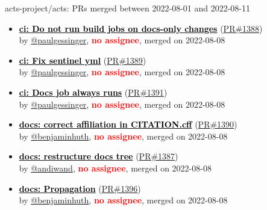 \begin{frame}[allowframebreaks]{ acts-project/acts: PRs merged 
between 2022-08-01 and 2022-08-11
}
\begin{itemize}
    \item\prmerged
    \hspace*{0.1em}
    \textbf{\href{https://github.com/acts-project/acts/pull/1388}{\textcolor{black}{ci: Do not run build jobs on docs-only changes}}}
    (\href{https://github.com/acts-project/acts/pull/1388}{PR\#1388}) \\
    by \href{https://github.com/paulgessinger}{@paulgessinger}, {}\textbf{\textcolor{Red}{no assignee}}, merged on 2022-08-08

    \item\prmerged
    \hspace*{0.1em}
    \textbf{\href{https://github.com/acts-project/acts/pull/1389}{\textcolor{black}{ci: Fix sentinel yml}}}
    (\href{https://github.com/acts-project/acts/pull/1389}{PR\#1389}) \\
    by \href{https://github.com/paulgessinger}{@paulgessinger}, {}\textbf{\textcolor{Red}{no assignee}}, merged on 2022-08-08

    \item\prmerged
    \hspace*{0.1em}
    \textbf{\href{https://github.com/acts-project/acts/pull/1391}{\textcolor{black}{ci: Docs job always runs}}}
    (\href{https://github.com/acts-project/acts/pull/1391}{PR\#1391}) \\
    by \href{https://github.com/paulgessinger}{@paulgessinger}, {}\textbf{\textcolor{Red}{no assignee}}, merged on 2022-08-08

    \item\prmerged
    \hspace*{0.1em}
    \textbf{\href{https://github.com/acts-project/acts/pull/1390}{\textcolor{black}{docs: correct affiliation in CITATION.cff}}}
    (\href{https://github.com/acts-project/acts/pull/1390}{PR\#1390}) \\
    by \href{https://github.com/benjaminhuth}{@benjaminhuth}, {}\textbf{\textcolor{Red}{no assignee}}, merged on 2022-08-08

    \item\prmerged\prwip
    \hspace*{0.1em}
    \textbf{\href{https://github.com/acts-project/acts/pull/1387}{\textcolor{black}{docs: restructure docs tree}}}
    (\href{https://github.com/acts-project/acts/pull/1387}{PR\#1387}) \\
    by \href{https://github.com/andiwand}{@andiwand}, {}\textbf{\textcolor{Red}{no assignee}}, merged on 2022-08-08

    \item\prmerged
    \hspace*{0.1em}
    \textbf{\href{https://github.com/acts-project/acts/pull/1396}{\textcolor{black}{docs: Propagation}}}
    (\href{https://github.com/acts-project/acts/pull/1396}{PR\#1396}) \\
    by \href{https://github.com/benjaminhuth}{@benjaminhuth}, {}\textbf{\textcolor{Red}{no assignee}}, merged on 2022-08-08


\end{itemize}
\end{frame}
